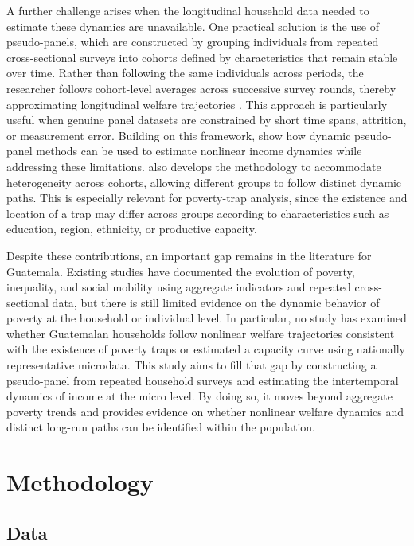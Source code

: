 \documentclass{article}
\begin{document}
A further challenge arises when the longitudinal household data needed to estimate these dynamics are unavailable. One practical solution is the use of pseudo-panels, which are constructed by grouping individuals from repeated cross-sectional surveys into cohorts defined by characteristics that remain stable over time. Rather than following the same individuals across periods, the researcher follows cohort-level averages across successive survey rounds, thereby approximating longitudinal welfare trajectories \parencite{mckenzie2004}. This approach is particularly useful when genuine panel datasets are constrained by short time spans, attrition, or measurement error. Building on this framework, \textcite{antman2007} show how dynamic pseudo-panel methods can be used to estimate nonlinear income dynamics while addressing these limitations. \textcite{mckenzie2004} also develops the methodology to accommodate heterogeneity across cohorts, allowing different groups to follow distinct dynamic paths. This is especially relevant for poverty-trap analysis, since the existence and location of a trap may differ across groups according to characteristics such as education, region, ethnicity, or productive capacity.

Despite these contributions, an important gap remains in the literature for Guatemala. Existing studies have documented the evolution of poverty, inequality, and social mobility using aggregate indicators and repeated cross-sectional data, but there is still limited evidence on the dynamic behavior of poverty at the household or individual level. In particular, no study has examined whether Guatemalan households follow nonlinear welfare trajectories consistent with the existence of poverty traps or estimated a capacity curve using nationally representative microdata. This study aims to fill that gap by constructing a pseudo-panel from repeated household surveys and estimating the intertemporal dynamics of income at the micro level. By doing so, it moves beyond aggregate poverty trends and provides evidence on whether nonlinear welfare dynamics and distinct long-run paths can be identified within the population.

\section{Methodology}

\subsection{Data}
\end{document}
